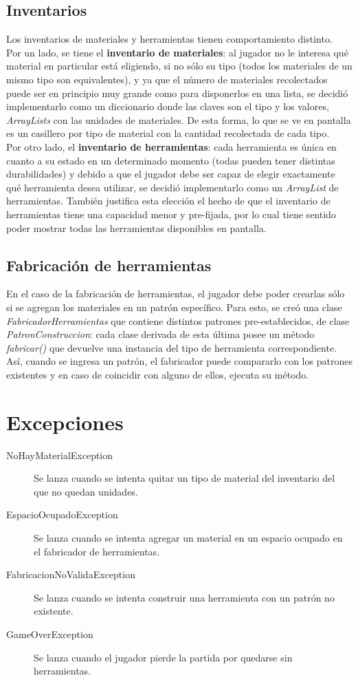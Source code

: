 \documentclass[titlepage,a4paper]{article}
\begin{document}
\subsection{Inventarios}
	Los inventarios de materiales y herramientas tienen comportamiento distinto.\\Por un lado, se tiene el \textbf{inventario de materiales}: al jugador no le interesa qué material en particular está eligiendo, si no sólo su tipo (todos los materiales de un mismo tipo son equivalentes), y ya que el número de materiales recolectados puede ser en principio muy grande como para disponerlos en una lista, se decidió implementarlo como un diccionario donde las claves son el tipo y los valores, \emph{ArrayLists} con las unidades de materiales. De esta forma, lo que se ve en pantalla es un casillero por tipo de material con la cantidad recolectada de cada tipo.\\
Por otro lado, el \textbf{inventario de herramientas}: cada herramienta es única en cuanto a su estado en un determinado momento (todas pueden tener distintas durabilidades) y debido a que el jugador debe ser capaz de elegir exactamente qué herramienta desea utilizar, se decidió implementarlo como un \emph{ArrayList} de herramientas. También justifica esta elección el hecho de que el inventario de herramientas tiene una capacidad menor y pre-fijada, por lo cual tiene sentido poder mostrar todas las herramientas disponibles en pantalla.
\subsection{Fabricación de herramientas}
	En el caso de la fabricación de herramientas, el jugador debe poder crearlas sólo si se agregan los materiales en un patrón específico. Para esto, se creó una clase \emph{FabricadorHerramientas} que contiene distintos patrones pre-establecidos, de clase \emph{PatronConstruccion}: cada clase derivada de esta última posee un método \emph{fabricar()} que devuelve una instancia del tipo de herramienta correspondiente. Así, cuando se ingresa un patrón, el fabricador puede compararlo con los patrones existentes y en caso de coincidir con alguno de ellos, ejecuta su método.

\section{Excepciones}\label{sec:excepciones}
\begin{description}
	\item[NoHayMaterialException] Se lanza cuando se intenta quitar un tipo de material del inventario del que no quedan unidades.
	\item[EspacioOcupadoException] Se lanza cuando se intenta agregar un material en un espacio ocupado en el fabricador de herramientas.
	\item[FabricacionNoValidaException] Se lanza cuando se intenta construir una herramienta con un patrón no existente.
	\item[GameOverException] Se lanza cuando el jugador pierde la partida por quedarse sin herramientas.
\end{description}
\end{document}

